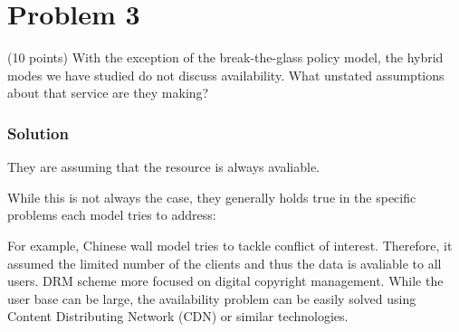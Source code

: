 \section*{Problem 3}

(10 points) With the exception of the break-the-glass policy model, the hybrid modes we have studied do not discuss availability. 
What unstated assumptions about that service are they making?

\subsubsection*{Solution}

They are assuming that the resource is always avaliable.

While this is not always the case, they generally holds true in the specific problems each model tries to address:

For example, Chinese wall model tries to tackle conflict of interest. Therefore, it assumed the limited number of the clients and thus the data is avaliable to all users.
DRM scheme more focused on digital copyright management. While the user base can be large, the availability problem can be easily solved using Content Distributing Network (CDN) or similar technologies.
